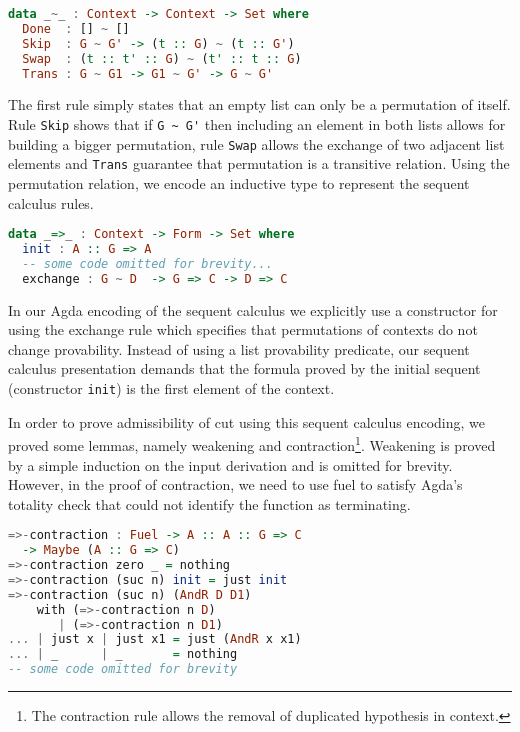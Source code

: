 \begin{lstlisting}[language=haskell]
data _~_ : Context -> Context -> Set where
  Done  : [] ~ []
  Skip  : G ~ G' -> (t :: G) ~ (t :: G')
  Swap  : (t :: t' :: G) ~ (t' :: t :: G)
  Trans : G ~ G1 -> G1 ~ G' -> G ~ G'
\end{lstlisting}

The first rule simply states that an empty list can only be a permutation of itself. Rule \lstinline|Skip|
shows that if \lstinline|G ~ G'| then including an element in both lists allows for building a bigger
permutation, rule \lstinline|Swap| allows the exchange of two adjacent list elements and \lstinline|Trans|
guarantee that permutation is a transitive relation. Using the permutation relation, we encode an
inductive type to represent the sequent calculus rules.

\begin{lstlisting}[language=haskell]
data _=>_ : Context -> Form -> Set where
  init : A :: G => A
  -- some code omitted for brevity...
  exchange : G ~ D  -> G => C -> D => C
\end{lstlisting}

In our Agda encoding of the sequent calculus we explicitly use a constructor for using the exchange rule
which specifies that permutations of contexts do not change provability. Instead of using a list provability
predicate, our sequent calculus presentation demands that the formula proved by the initial sequent
(constructor \lstinline|init|) is the first element of the context.


In order to prove admissibility of cut using this sequent calculus encoding, we proved some lemmas, namely weakening
and contraction\footnote{The contraction rule allows the removal of duplicated hypothesis in context.}. Weakening is
proved by a simple induction on the input derivation and is omitted for brevity. However, in the proof of contraction,
 we need to use fuel to satisfy Agda's totality check that could not identify the function as terminating.

\begin{lstlisting}[language=haskell]
=>-contraction : Fuel -> A :: A :: G => C
  -> Maybe (A :: G => C)
=>-contraction zero _ = nothing
=>-contraction (suc n) init = just init
=>-contraction (suc n) (AndR D D1)
    with (=>-contraction n D)
       | (=>-contraction n D1)
... | just x | just x1 = just (AndR x x1)
... | _      | _       = nothing
-- some code omitted for brevity
\end{lstlisting}

